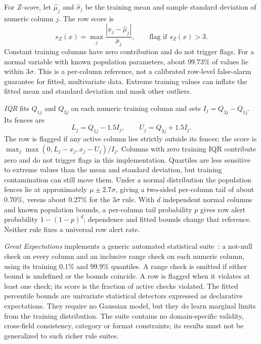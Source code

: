 \documentclass[conference]{IEEEtran}
\begin{document}
For \emph{Z-score}, let $\hat\mu_j$ and $\hat\sigma_j$ be the training mean
and sample standard deviation of numeric column $j$. The row score is
\begin{equation}
s_Z(x)=\max_j \frac{|x_j-\hat\mu_j|}{\hat\sigma_j},
\qquad \text{flag if }s_Z(x)>3.
\end{equation}
Constant training columns have zero contribution and do not trigger flags.
For a normal variable with known population parameters, about $99.73\%$
of values lie within $3\sigma$. This is a per-column reference, not a
calibrated row-level false-alarm guarantee for fitted, multivariate data.
Extreme training values can inflate the fitted mean and standard deviation
and mask other outliers.

\emph{IQR} fits $Q_{1j}$ and $Q_{3j}$ on each numeric training column and
sets $I_j=Q_{3j}-Q_{1j}$. Its fences are
\begin{equation}
L_j=Q_{1j}-1.5I_j,\qquad U_j=Q_{3j}+1.5I_j.
\end{equation}
The row is flagged if any active column lies strictly outside its fences;
the score is $\max_j\max(0,L_j-x_j,x_j-U_j)/I_j$.
Columns with zero training IQR contribute zero and do not trigger flags in
this implementation. Quartiles are less sensitive to extreme values than
the mean and standard deviation, but training contamination can still move
them. Under a normal distribution the population fences lie at approximately
$\mu\pm2.7\sigma$, giving a two-sided per-column tail of about $0.70\%$,
versus about $0.27\%$ for the $3\sigma$ rule. With $d$ independent normal
columns and known population bounds, a per-column tail probability $p$
gives row alert probability $1-(1-p)^d$; dependence and fitted bounds change
that reference. Neither rule fixes a universal row alert rate.

\emph{Great Expectations} implements a generic automated statistical
suite~\cite{dataqualitysurvey2024}: a not-null check on every column and
an inclusive range check on each numeric column, using its training
$0.1\%$ and $99.9\%$ quantiles. A range check is omitted if either bound
is undefined or the bounds coincide. A row is flagged when it violates at
least one check; its score is the fraction of active checks violated.
The fitted percentile bounds are univariate statistical detectors expressed
as declarative expectations. They require no Gaussian model, but they do
learn marginal limits from the training distribution. The suite contains
no domain-specific validity, cross-field consistency, category or format
constraints; its results must not be generalized to such richer rule suites.
\end{document}
